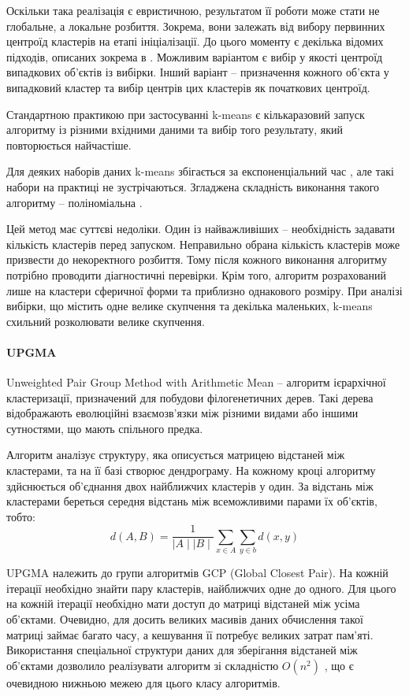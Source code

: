         Оскільки така реалізація є евристичною, результатом її роботи може стати не глобальне, а локальне розбиття. Зокрема, вони залежать від вибору первинних центроїд кластерів на етапі ініціалізації. До цього моменту є декілька відомих підходів, описаних зокрема в \cite{HamerlyKMeansOptimization}. Можливим варіантом є вибір у якості центроїд випадкових об'єктів із вибірки. Інший варіант -- призначення кожного об'єкта у випадковий кластер та вибір центрів цих кластерів як початкових центроїд.
        
        Стандартною практикою при застосуванні k-means є кількаразовий запуск алгоритму із різними вхідними даними та вибір того результату, який повторюється найчастіше.
        
        Для деяких наборів даних k-means збігається за експоненціальний час \cite{KMeansWorstCaseComplexity}, але такі набори на практиці не зустрічаються. Згладжена складність виконання такого алгоритму -- поліноміальна \cite{KMeansSmoothedComplexity}. 
        
        Цей метод має суттєві недоліки. Один із найважливіших -- необхідність задавати кількість кластерів перед запуском. Неправильно обрана кількість кластерів може призвести до некоректного розбиття. Тому після кожного виконання алгоритму потрібно проводити діагностичні перевірки. Крім того, алгоритм розрахований лише на кластери сферичної форми та приблизно однакового розміру. При аналізі вибірки, що містить одне велике скупчення та декілька маленьких, k-means схильний розколювати велике скупчення.
        
    \paragraph {UPGMA}
        Unweighted Pair Group Method with Arithmetic Mean -- алгоритм ієрархічної кластеризації, призначений для побудови філогенетичних дерев. Такі дерева відображають еволюційні взаємозв'язки між різними видами або іншими сутностями, що мають спільного предка.
        
        Алгоритм аналізує структуру, яка описується матрицею відстаней між кластерами, та на її базі створює дендрограму. На кожному кроці алгоритму здйснюється об'єднання двох найближчих кластерів у один. За відстань між кластерами береться середня відстань між всеможливими парами їх об'єктів, тобто:
        \[
            d(A, B) = \frac{1}{\mid A \mid \mid B \mid} \sum_{x \in A} \sum_{y \in b} d(x, y)
        \]
        
        UPGMA належить до групи алгоритмів GCP (Global Closest Pair). На кожній ітерації необхідно знайти пару кластерів, найближчих одне до одного. Для цього на кожній ітерації необхідно мати доступ до матриці відстаней між усіма об'єктами. Очевидно, для досить великих масивів даних обчислення такої матриці займає багато часу, а кешування її потребує великих затрат пам'яті. Використання спеціальної структури даних для зберігання відстаней між об'єктами дозволило реалізувати алгоритм зі складністю $O(n^2)$ \cite{Eppstein}, що є очевидною нижньою межею для цього класу алгоритмів.
        
